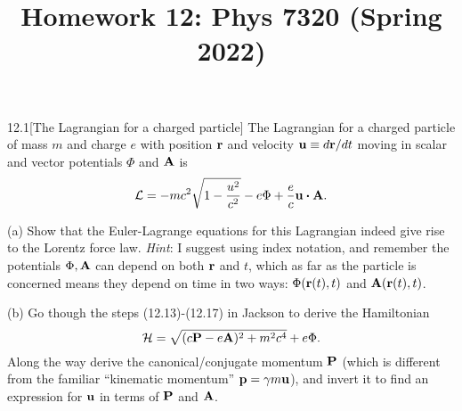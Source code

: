 \documentclass[12pt]{article}
\title{Homework 12: Phys 7320 (Spring 2022)}
\begin{document}
\maketitle
\begin{problem}{12.1}[The Lagrangian for a charged particle]
The Lagrangian for a charged particle of mass $m$ and charge $e$ with position
$\vb{r}$ and velocity $\vb{u}\equiv d\vb{r}/dt$ moving in scalar and vector
potentials $\Phi$ and $\vb{A}$ is
\begin{equation}
    \LL=-mc^2\sqrt{1-\frac{u^2}{c^2}}-e\Phi+\frac{e}{c}\vb{u}\vdot\vb{A}.
\end{equation}

(a) Show that the Euler-Lagrange equations for this Lagrangian indeed give rise
to the Lorentz force law. \textit{Hint}: I suggest using index notation, and
remember the potentials $\Phi,\vb{A}$ can depend on both $\vb{r}$ and $t$, which
as far as the particle is concerned means they depend on time in two ways:
$\Phi(\vb{r}(t),t)$ and $\vb{A}(\vb{r}(t),t)$.

(b) Go though the steps (12.13)-(12.17) in Jackson to derive the Hamiltonian
\begin{equation}
    \mathcal{H}=\sqrt{(c\vb{P}-e\vb{A})^2+m^2c^4}+e\Phi. 
\end{equation}
Along the way derive the canonical/conjugate momentum $\vb{P}$ (which is
different from the familiar ``kinematic momentum'' $\vb{p}=\gamma m\vb{u}$), and
invert it to find an expression for $\vb{u}$ in terms of $\vb{P}$ and $\vb{A}$.


\end{problem}
\end{document}
